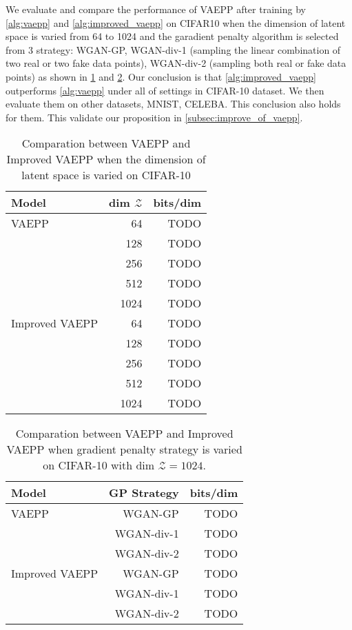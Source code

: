 We evaluate and compare the performance of VAEPP after training by \cref{alg:vaepp} and \cref{alg:improved_vaepp} on CIFAR10 when the dimension of latent space is varied from 64 to 1024 and the garadient penalty algorithm is selected from 3 strategy: WGAN-GP, WGAN-div-1  (sampling the linear combination of two real or two fake data points), WGAN-div-2 (sampling both real or fake data points) as shown in \cref{tab:compre_nD_over_z_dim} and \cref{tab:compre_nD_over_R}. Our conclusion is that \cref{alg:improved_vaepp} outperforms \cref{alg:vaepp} under all of settings in CIFAR-10 dataset. We then evaluate them on other datasets, MNIST, CELEBA. This conclusion also holds for them. This validate our proposition in \cref{subsec:improve_of_vaepp}. 

\begin{table}
\centering
\begin{tabular}{lrr}  
\toprule
Model  &  dim $\mathcal{Z}$  &  bits/dim \\
\midrule
VAEPP            &  64   & TODO      \\
                 &  128  & TODO      \\
                 &  256  & TODO      \\
                 &  512  & TODO      \\
                 &  1024 & TODO      \\
Improved VAEPP   &  64   & TODO      \\
                 &  128  & TODO      \\
                 &  256  & TODO      \\
                 &  512  & TODO      \\
                 &  1024 & TODO      \\
\bottomrule
\end{tabular}
\caption{Comparation between VAEPP and Improved VAEPP when the dimension of latent space is varied on CIFAR-10}
\label{tab:compre_nD_over_z_dim}
\end{table}

\begin{table}
\centering
\begin{tabular}{lrr}  
\toprule
Model  &  GP Strategy  &  bits/dim \\
\midrule
VAEPP            &  WGAN-GP   & TODO      \\
                 &  WGAN-div-1  & TODO      \\
                 &  WGAN-div-2  & TODO      \\
Improved VAEPP   &  WGAN-GP   & TODO      \\
                 &  WGAN-div-1  & TODO     \\
                 &  WGAN-div-2  & TODO      \\
\bottomrule
\end{tabular}
\caption{Comparation between VAEPP and Improved VAEPP when gradient penalty strategy is varied on CIFAR-10 with dim $\mathcal{Z} = 1024$. }
\label{tab:compre_nD_over_R}
\end{table}

